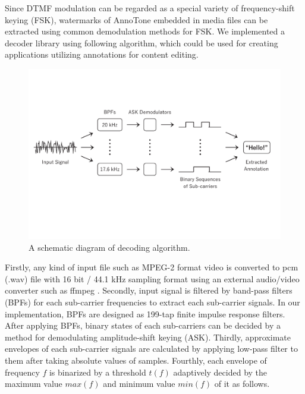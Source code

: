 Since DTMF modulation can be regarded as a special variety of frequency-shift keying (FSK), watermarks of AnnoTone embedded in media files can be extracted using common demodulation methods for FSK.
We implemented a decoder library using following algorithm, which could be used for creating applications utilizing annotations for content editing.

\begin{figure}[htbp]
 \begin{center}
  \vspace{5mm}
  \includegraphics[width=130mm]{implementation_decode.pdf}
 \end{center}
 \caption{A schematic diagram of decoding algorithm.}
 \label{fig:impl_decd}
\end{figure}

Firstly, any kind of input file such as MPEG-2 format video is converted to pcm (.wav) file with 16 bit / 44.1 kHz sampling format using an external audio/video converter such as ffmpeg \cite{ffmpeg}.
Secondly, input signal is filtered by band-pass filters (BPFs) for each sub-carrier frequencies to extract each sub-carrier signals.
In our implementation, BPFs are designed as 199-tap finite impulse response filters.
After applying BPFs, binary states of each sub-carriers can be decided by a method for demodulating amplitude-shift keying (ASK).
Thirdly, approximate envelopes of each sub-carrier signals are calculated by applying low-pass filter to them after taking absolute values of samples.
Fourthly, each envelope of frequency $f$ is binarized by a threshold $t(f)$ adaptively decided by the maximum value $max(f)$ and minimum value $min(f)$ of it as follows.

